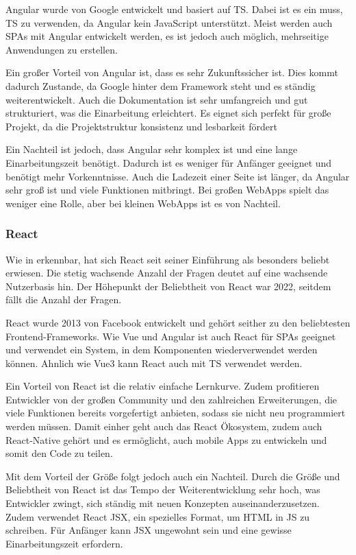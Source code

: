 \documentclass[biblatex]{lni}
\begin{document}
Angular wurde von Google entwickelt und basiert auf \ac{TS}. \cite{NG}
Dabei ist es ein muss, \ac{TS} zu verwenden, da Angular kein JavaScript unterstützt.
Meist werden auch \ac{SPA}s mit Angular entwickelt werden, es ist jedoch auch möglich, mehrseitige Anwendungen zu erstellen.

Ein großer Vorteil von Angular ist, dass es sehr Zukunftssicher ist. \cite{BStack}
Dies kommt dadurch Zustande, da Google hinter dem Framework steht und es ständig weiterentwickelt.
Auch die Dokumentation ist sehr umfangreich und gut strukturiert, was die Einarbeitung erleichtert. \cite{NG}
Es eignet sich perfekt für große Projekt, da die Projektstruktur konsistenz und lesbarkeit fördert

Ein Nachteil ist jedoch, dass Angular sehr komplex ist und eine lange Einarbeitungszeit benötigt. \cite{BStack}
Dadurch ist es weniger für Anfänger geeignet und benötigt mehr Vorkenntnisse.
Auch die Ladezeit einer Seite ist länger, da Angular sehr groß ist und viele Funktionen mitbringt.
Bei großen \ac{WebApp}s spielt das weniger eine Rolle, aber bei kleinen \ac{WebApp}s ist es von Nachteil.

\subsubsection{React}

Wie in  erkennbar, hat sich React seit seiner Einführung als besonders beliebt erwiesen.
Die stetig wachsende Anzahl der Fragen deutet auf eine wachsende Nutzerbasis hin.
Der Höhepunkt der Beliebtheit von React war 2022, seitdem fällt die Anzahl der Fragen.

React wurde 2013 von Facebook entwickelt und gehört seither zu den beliebtesten Frontend-Frameworks. \cite{BStack}
Wie Vue und Angular ist auch React für \ac{SPA}s geeignet und verwendet ein System, in dem Komponenten wiederverwendet werden können.
Ahnlich wie Vue3 kann React auch mit \ac{TS} verwendet werden.\cite{RCT}

Ein Vorteil von React ist die relativ einfache Lernkurve. \cite{BStack}
Zudem profitieren Entwickler von der großen Community und den zahlreichen Erweiterungen,
die viele Funktionen bereits vorgefertigt anbieten,
sodass sie nicht neu programmiert werden müssen.
Damit einher geht auch das React Ökosystem, zudem auch React-Native gehört und es ermöglicht,
auch mobile Apps zu entwickeln und somit den Code zu teilen. \cite{RCTN}

Mit dem Vorteil der Größe folgt jedoch auch ein Nachteil. \cite{BStack}
Durch die Größe und Beliebtheit von React ist das Tempo der Weiterentwicklung sehr hoch,
was Entwickler zwingt, sich ständig mit neuen Konzepten auseinanderzusetzen.
Zudem verwendet React \ac{JSX}, ein spezielles Format, um \ac{HTML} in \ac{JS} zu schreiben. \cite{JSX}
Für Anfänger kann \ac{JSX} ungewohnt sein und eine gewisse Einarbeitungszeit erfordern.
\end{document}
